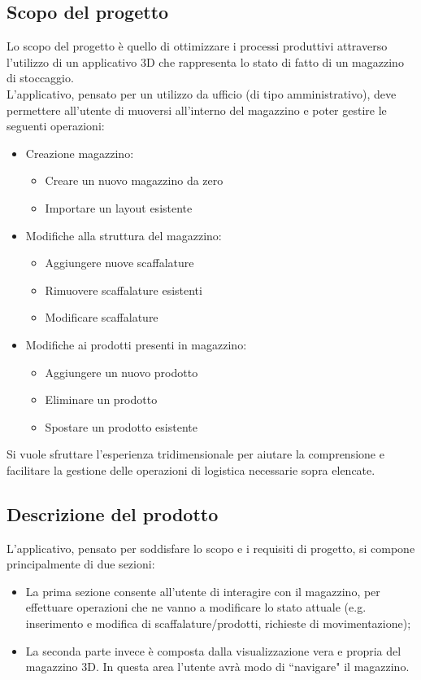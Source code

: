 \subsection{Scopo del progetto}\label{sec:scopo_del_progetto}
Lo scopo del progetto è quello di ottimizzare i processi produttivi attraverso l'utilizzo di 
un applicativo 3D che rappresenta lo stato di fatto di un magazzino di stoccaggio.\\
L'applicativo, pensato per un utilizzo da ufficio (di tipo amministrativo), deve permettere all'utente di muoversi all'interno 
del magazzino e poter gestire le seguenti operazioni:
\begin{itemize}
    \item Creazione magazzino:
        \begin{itemize}
            \item Creare un nuovo magazzino da zero
            \item Importare un layout esistente
        \end{itemize}
    \item Modifiche alla struttura del magazzino:
        \begin{itemize}            
            \item Aggiungere nuove scaffalature
            \item Rimuovere scaffalature esistenti
            \item Modificare scaffalature
        \end{itemize}
    \item Modifiche ai prodotti presenti in magazzino:
        \begin{itemize}            
            \item Aggiungere un nuovo prodotto
            \item Eliminare un prodotto
            \item Spostare un prodotto esistente
        \end{itemize}
\end{itemize}
Si vuole sfruttare l'esperienza tridimensionale per aiutare la comprensione e facilitare la gestione delle 
operazioni di logistica necessarie sopra elencate. 


\subsection{Descrizione del prodotto}\label{sec:descrizione_del_prodotto}
L'applicativo, pensato per soddisfare lo scopo e i requisiti di progetto, si compone principalmente di due sezioni:
\begin{itemize}
    \item La prima sezione consente all'utente di interagire con il magazzino, per effettuare operazioni che ne vanno a modificare lo stato attuale (e.g. inserimento e modifica di scaffalature/prodotti, richieste di movimentazione);
    \item La seconda parte invece è composta dalla visualizzazione vera e propria del magazzino 3D. In questa area l'utente avrà modo di ``navigare" il magazzino. 
\end{itemize}

